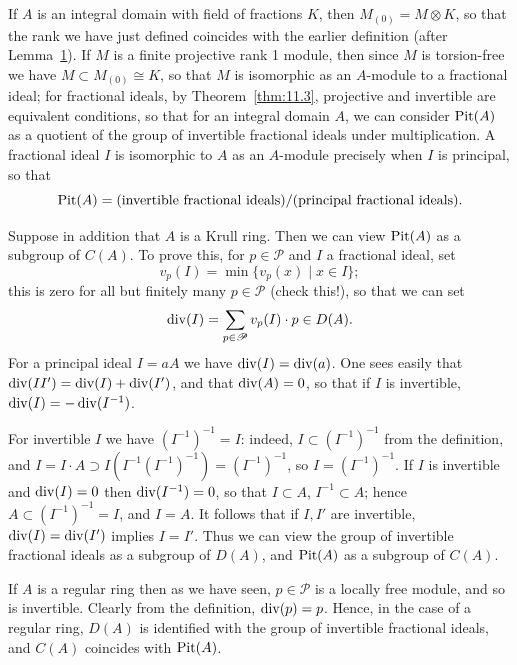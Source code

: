 If $A$ is an integral domain with field of fractions $K$, then $M_{(0)} = M \otimes K$,
so that the rank we have just defined coincides with the earlier definition
(after Lemma~\hyperref[lem:20.1]{1}). If $M$ is a finite projective rank 1 module, then since $M$
is torsion-free we have $M \subset M_{(0)} \cong K$, so that $M$ is isomorphic as an
$A$-module to a fractional ideal; for fractional ideals, by Theorem~\ref{thm:11.3},
projective and invertible are equivalent conditions, so that for an integral
domain $A$, we can consider $\operatorname{Pit}(A)$ as a quotient of the group of invertible
fractional ideals under multiplication. A fractional ideal $I$ is isomorphic
to $A$ as an $A$-module precisely when $I$ is principal, so that
\[
  \operatorname{Pit}(A) = (\text{invertible fractional ideals})/(\text{principal fractional ideals}).
\]

Suppose in addition that $A$ is a Krull ring. Then we can view $\operatorname{Pit}(A)$
as a subgroup of $C(A)$. To prove this, for $p \in \mathscr{P}$ and $I$ a fractional ideal,
set
\[
  v_p(I) = \min \{v_p(x) \mid x \in I\};
\]
this is zero for all but finitely many $p \in \mathscr{P}$ (check this!), so that we can set
\[
  \operatorname{div}(I) = \sum_{p \in \mathscr{P}} v_p(I) \cdot p \in D(A).
\]
For a principal ideal $I = aA$ we have $\operatorname{div}(I) = \operatorname{div}(a)$. One sees easily that
$\operatorname{div}(II') = \operatorname{div}(I) + \operatorname{div}(I')$, and that $\operatorname{div}(A) = 0$, so that if $I$ is invertible,
$\operatorname{div}(I) = -\operatorname{div}(I^{-1})$.

For invertible $I$ we have $(I^{-1})^{-1} = I$: indeed, $I \subset (I^{-1})^{-1}$ from the
definition, and $I = I \cdot A \supset I(I^{-1}(I^{-1})^{-1}) = (I^{-1})^{-1}$, so $I = (I^{-1})^{-1}$. If $I$ is invertible and
$\operatorname{div}(I) = 0$ then $\operatorname{div}(I^{-1}) = 0$, so that $I \subset A$, $I^{-1} \subset A$; hence $A \subset (I^{-1})^{-1} = I$,
and $I = A$. It follows that if $I, I'$ are invertible, $\operatorname{div}(I) = \operatorname{div}(I')$ implies $I = I'$.
Thus we can view the group of invertible fractional ideals as a subgroup of
$D(A)$, and $\operatorname{Pit}(A)$ as a subgroup of $C(A)$.

If $A$ is a regular ring then as we have seen, $p \in \mathscr{P}$ is a locally free module,
and so is invertible. Clearly from the definition, $\operatorname{div}(p) = p$. Hence, in
the case of a regular ring, $D(A)$ is identified with the group of invertible
fractional ideals, and $C(A)$ coincides with $\operatorname{Pit}(A)$.

